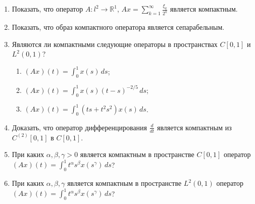 \documentclass[12pt,a4paper]{article}
\begin{document}
\begin{enumerate}
\item Показать, что оператор $A: l^{2} \rightarrow \mathbb{R}^{1}$, $Ax = \sum_{k=1}^{\infty} \frac{\xi_{k}}{2^{k}}$ является компактным.

\item Показать, что образ компактного оператора является сепарабельным.

\item Являются ли компактными следующие операторы в пространствах $C[0,1]$ и $L^{2}(0,1)$?
\begin{enumerate}[label=\alph*)]
\item $(Ax)(t) = \int_{0}^{1} x(s) \, ds$;
\item $(Ax)(t) = \int_{0}^{1} x(s)(t-s)^{-2/5} \, ds$;
\item $(Ax)(t) = \int_{0}^{1} (ts + t^{2}s^{2})x(s) \, ds$.
\end{enumerate}

\item Доказать, что оператор дифференцирования $\frac{d}{dt}$ является компактным из $C^{(2)}[0,1]$ в $C[0,1]$.

\item При каких $\alpha, \beta, \gamma > 0$ является компактным в пространстве $C[0,1]$ оператор $(Ax)(t) = \int_{0}^{1} t^{\alpha} s^{\beta} x(s^{\gamma}) \, ds$?

\item При каких $\alpha, \beta, \gamma$ является компактным в пространстве $L^{2}(0,1)$ оператор $(Ax)(t) = \int_{0}^{1} t^{\alpha} s^{\beta} x(s^{\gamma}) \, ds$?
\end{enumerate}
\end{document}
